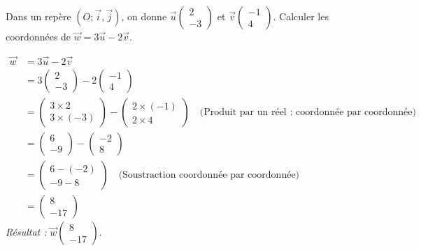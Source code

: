 \documentclass[11pt]{article}
\begin{document}
\begin{exoresolu}
Dans un repère $(O; \vec{i}, \vec{j})$, on donne $\vec{u}\begin{pmatrix} 2 \\ -3 \end{pmatrix}$ et $\vec{v}\begin{pmatrix} -1 \\ 4 \end{pmatrix}$.
Calculer les coordonnées de $\vec{w} = 3\vec{u} - 2\vec{v}$.

\begin{align*}
\vec{w} &= 3\vec{u} - 2\vec{v} \\
&= 3\begin{pmatrix} 2 \\ -3 \end{pmatrix} - 2\begin{pmatrix} -1 \\ 4 \end{pmatrix} \\
&= \begin{pmatrix} 3\times 2 \\ 3\times (-3) \end{pmatrix} - \begin{pmatrix} 2\times (-1) \\ 2\times 4 \end{pmatrix} \quad \text{(Produit par un réel : coordonnée par coordonnée)} \\
&= \begin{pmatrix} 6 \\ -9 \end{pmatrix} - \begin{pmatrix} -2 \\ 8 \end{pmatrix} \\
&= \begin{pmatrix} 6 - (-2) \\ -9 - 8 \end{pmatrix} \quad \text{(Soustraction coordonnée par coordonnée)} \\
&= \begin{pmatrix} 8 \\ -17 \end{pmatrix}
\end{align*}
\emph{Résultat :} $\vec{w}\begin{pmatrix} 8 \\ -17 \end{pmatrix}$.
\end{exoresolu}
\end{document}
